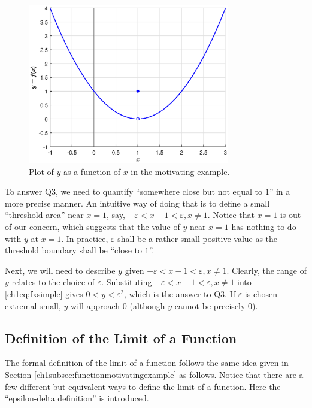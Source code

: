 \begin{figure}
\centering
\includegraphics[width=250pt]{chapters/chapter1/figures/fig_fxsimple.eps}
\caption{Plot of $y$ as a function of $x$ in the motivating example.} \label{ch1fig:fxsimpleexample}
\end{figure}

To answer Q3, we need to quantify ``somewhere close but not equal to $1$'' in a more precise manner. An intuitive way of doing that is to define a small ``threshold area'' near $x=1$, say, $-\varepsilon < x-1 < \varepsilon, x \neq 1$. Notice that $x=1$ is out of our concern, which suggests that the value of $y$ near $x=1$ has nothing to do with $y$ at $x=1$. In practice, $\varepsilon$ shall be a rather small positive value as the threshold boundary shall be ``close to $1$''.

Next, we will need to describe $y$ given $-\varepsilon < x-1 < \varepsilon, x \neq 1$. Clearly, the range of $y$ relates to the choice of $\varepsilon$. Substituting $-\varepsilon < x-1 < \varepsilon, x \neq 1$ into \eqref{ch1eq:fxsimple} gives $0 < y < \varepsilon^2$, which is the answer to Q3. If $\varepsilon$ is chosen extremal small, $y$ will approach $0$ (although $y$ cannot be precisely $0$).

\subsection{Definition of the Limit of a Function} \label{ch1subsec:definationoflimitoffunction}

The formal definition of the limit of a function follows the same idea given in Section \ref{ch1subsec:functionmotivatingexample} as follows. Notice that there are a few different but equivalent ways to define the limit of a function. Here the ``epsilon-delta definition'' is introduced.


